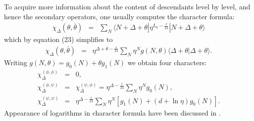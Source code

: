 \documentclass[a4paper,11pt]{article}
\begin{document}
To acquire more information about the content of descendants
level by level, and hence the secondary operators, one usually
computes the character formula:
\begin{eqnarray}
\chi_{\Delta}(\theta,\bar{\theta})&=&\sum_{N}\langle
N+\Delta+\theta| \eta^{L_{0}-\frac{c}{24}}|N+\Delta+\theta\rangle
\end{eqnarray}
which by equation (23) simplifies to
\begin{eqnarray}
\chi_{\Delta}(\theta,\bar{\theta})&=&\eta^{\Delta+\theta-\frac{c}{24}}
\sum_{N} \eta^{N}g(N,\theta)\langle \Delta+\theta
|\Delta+\theta\rangle .
\end{eqnarray}
Writing $g(N,\theta)=g_{0}(N)+\theta g_{1}(N)$ we obtain four
characters:
\begin{eqnarray}
\chi_{\Delta}^{(\phi,\phi)}&=&0 ,\nonumber\\
\chi_{\Delta}^{(\phi,\psi)}&=&\chi_{\Delta}^{(\psi,\phi)}=
\eta^{\Delta-\frac{c}{24}}\sum_{N} \eta^{N}g_{0}(N) ,\nonumber\\
 \chi_{\Delta}^{(\psi,\psi)}&=&\eta^{\Delta-\frac{c}{24}}\sum_{N}
\eta^{N}\left[g_{1}(N)+(d+\ln\eta)g_{0}(N)\right] .
\end{eqnarray}
Appearance of logarithms in character formula have been discussed
in \cite{Fl-CP1,Kogan}.
\end{document}
